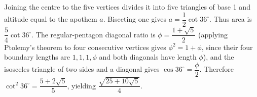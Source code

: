 Joining the centre to the five vertices divides it into five triangles of base 1 and altitude equal to the apothem $a$. Bisecting one gives $a=\dfrac{1}{2}\cot36^\circ$. Thus area is $\dfrac{5}{4}\cot36^\circ$. The regular-pentagon diagonal ratio is $\phi=\dfrac{1+\sqrt5}{2}$ (applying Ptolemy's theorem to four consecutive vertices gives $\phi^2=1+\phi$, since their four boundary lengths are $1,1,1,\phi$ and both diagonals have length $\phi$), and the isosceles triangle of two sides and a diagonal gives $\cos36^\circ=\dfrac{\phi}{2}$. Therefore $\cot^2 36^\circ=\dfrac{5+2\sqrt5}{5}$, yielding $\boxed{\dfrac{\sqrt{25+10\sqrt5}}{4}}$.
